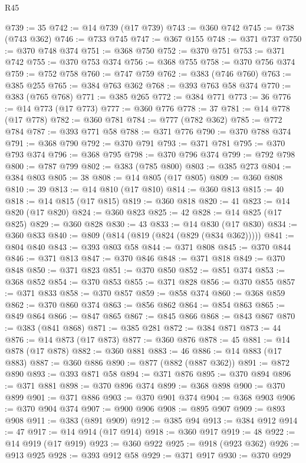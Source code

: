 \begin{lexlean}{R45}
\begin{coremodule}
@739 := 35
@742 := @14 @739 (@17 @739)
@743 := @360 @742
@745 := @738 (@743 @362)
@746 := @733 @745
@747 := @367 @155
@748 := @371 @737
@750 := @370 @748 @374
@751 := @368 @750
@752 := @370 @751
@753 := @371 @742
@755 := @370 @753 @374
@756 := @368 @755
@758 := @370 @756 @374
@759 := @752 @758
@760 := @747 @759
@762 := @383 (@746 @760)
@763 := @385 @255
@765 := @384 @763 @362
@768 := @393 @763 @58 @374
@770 := @383 (@765 @768)
@771 := @385 @265
@772 := @384 @771
@773 := 36
@776 := @14 @773 (@17 @773)
@777 := @360 @776
@778 := 37
@781 := @14 @778 (@17 @778)
@782 := @360 @781
@784 := @777 (@782 @362)
@785 := @772 @784
@787 := @393 @771 @58
@788 := @371 @776
@790 := @370 @788 @374
@791 := @368 @790
@792 := @370 @791
@793 := @371 @781
@795 := @370 @793 @374
@796 := @368 @795
@798 := @370 @796 @374
@799 := @792 @798
@800 := @787 @799
@802 := @383 (@785 @800)
@803 := @385 @273
@804 := @384 @803
@805 := 38
@808 := @14 @805 (@17 @805)
@809 := @360 @808
@810 := 39
@813 := @14 @810 (@17 @810)
@814 := @360 @813
@815 := 40
@818 := @14 @815 (@17 @815)
@819 := @360 @818
@820 := 41
@823 := @14 @820 (@17 @820)
@824 := @360 @823
@825 := 42
@828 := @14 @825 (@17 @825)
@829 := @360 @828
@830 := 43
@833 := @14 @830 (@17 @830)
@834 := @360 @833
@840 := @809 (@814 (@819 (@824 (@829 (@834 @362)))))
@841 := @804 @840
@843 := @393 @803 @58
@844 := @371 @808
@845 := @370 @844
@846 := @371 @813
@847 := @370 @846
@848 := @371 @818
@849 := @370 @848
@850 := @371 @823
@851 := @370 @850
@852 := @851 @374
@853 := @368 @852
@854 := @370 @853
@855 := @371 @828
@856 := @370 @855
@857 := @371 @833
@858 := @370 @857
@859 := @858 @374
@860 := @368 @859
@862 := @370 @860 @374
@863 := @856 @862
@864 := @854 @863
@865 := @849 @864
@866 := @847 @865
@867 := @845 @866
@868 := @843 @867
@870 := @383 (@841 @868)
@871 := @385 @281
@872 := @384 @871
@873 := 44
@876 := @14 @873 (@17 @873)
@877 := @360 @876
@878 := 45
@881 := @14 @878 (@17 @878)
@882 := @360 @881
@883 := 46
@886 := @14 @883 (@17 @883)
@887 := @360 @886
@890 := @877 (@882 (@887 @362))
@891 := @872 @890
@893 := @393 @871 @58
@894 := @371 @876
@895 := @370 @894
@896 := @371 @881
@898 := @370 @896 @374
@899 := @368 @898
@900 := @370 @899
@901 := @371 @886
@903 := @370 @901 @374
@904 := @368 @903
@906 := @370 @904 @374
@907 := @900 @906
@908 := @895 @907
@909 := @893 @908
@911 := @383 (@891 @909)
@912 := @385 @94
@913 := @384 @912
@914 := 47
@917 := @14 @914 (@17 @914)
@918 := @360 @917
@919 := 48
@922 := @14 @919 (@17 @919)
@923 := @360 @922
@925 := @918 (@923 @362)
@926 := @913 @925
@928 := @393 @912 @58
@929 := @371 @917
@930 := @370 @929

\end{coremodule}
\end{lexlean}
